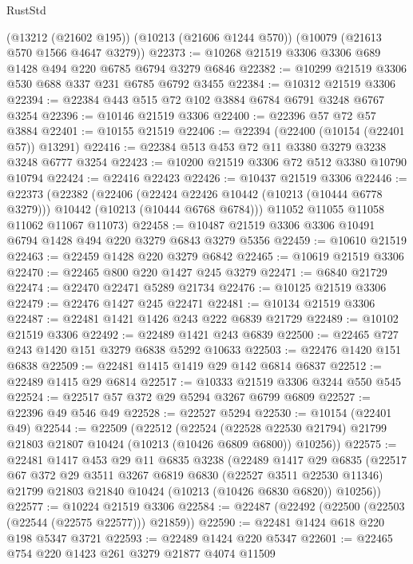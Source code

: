 \begin{lexlean}{RustStd}
\begin{coremodule}
    (@13212 (@21602 @195))
    (@10213 (@21606 @1244 @570))
    (@10079 (@21613 @570 @1566 @4647 @3279))
@22373 := @10268 @21519 @3306 @3306 @689 @1428 @494 @220 @6785 @6794 @3279 @6846
@22382 := @10299 @21519 @3306 @530 @688 @337 @231 @6785 @6792 @3455
@22384 := @10312 @21519 @3306
@22394 := @22384 @443 @515 @72 @102 @3884 @6784 @6791 @3248 @6767 @3254
@22396 := @10146 @21519 @3306
@22400 := @22396 @57 @72 @57 @3884
@22401 := @10155 @21519
@22406 := @22394 (@22400 (@10154 (@22401 @57)) @13291)
@22416 := @22384 @513 @453 @72 @11 @3380 @3279 @3238 @3248 @6777 @3254
@22423 := @10200 @21519 @3306 @72 @512 @3380 @10790 @10794
@22424 := @22416 @22423
@22426 := @10437 @21519 @3306
@22446 := @22373
    (@22382
      (@22406
        (@22424 @22426 @10442 (@10213 (@10444 @6778 @3279)))
        @10442
        (@10213 (@10444 @6768 @6784)))
      @11052
      @11055
      @11058
      @11062
      @11067
      @11073)
@22458 := @10487 @21519 @3306 @3306 @10491 @6794 @1428 @494 @220 @3279 @6843 @3279 @5356
@22459 := @10610 @21519
@22463 := @22459 @1428 @220 @3279 @6842
@22465 := @10619 @21519 @3306
@22470 := @22465 @800 @220 @1427 @245 @3279
@22471 := @6840 @21729
@22474 := @22470 @22471 @5289 @21734
@22476 := @10125 @21519 @3306
@22479 := @22476 @1427 @245 @22471
@22481 := @10134 @21519 @3306
@22487 := @22481 @1421 @1426 @243 @222 @6839 @21729
@22489 := @10102 @21519 @3306
@22492 := @22489 @1421 @243 @6839
@22500 := @22465 @727 @243 @1420 @151 @3279 @6838 @5292 @10633
@22503 := @22476 @1420 @151 @6838
@22509 := @22481 @1415 @1419 @29 @142 @6814 @6837
@22512 := @22489 @1415 @29 @6814
@22517 := @10333 @21519 @3306 @3244 @550 @545
@22524 := @22517 @57 @372 @29 @5294 @3267 @6799 @6809
@22527 := @22396 @49 @546 @49
@22528 := @22527 @5294
@22530 := @10154 (@22401 @49)
@22544 := @22509
    (@22512
      (@22524
        (@22528 @22530 @21794)
        @21799
        @21803
        @21807
        @10424
        (@10213 (@10426 @6809 @6800))
        @10256))
@22575 := @22481
    @1417
    @453
    @29
    @11
    @6835
    @3238
    (@22489
      @1417
      @29
      @6835
      (@22517
        @67
        @372
        @29
        @3511
        @3267
        @6819
        @6830
        (@22527 @3511 @22530 @11346)
        @21799
        @21803
        @21840
        @10424
        (@10213 (@10426 @6830 @6820))
        @10256))
@22577 := @10224 @21519 @3306
@22584 := @22487 (@22492 (@22500 (@22503 (@22544 (@22575 @22577))) @21859))
@22590 := @22481 @1424 @618 @220 @198 @5347 @3721
@22593 := @22489 @1424 @220 @5347
@22601 := @22465 @754 @220 @1423 @261 @3279 @21877 @4074 @11509

\end{coremodule}
\end{lexlean}
